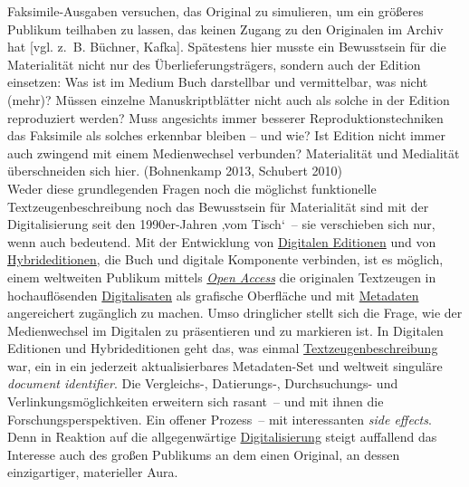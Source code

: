 \documentclass{article}
\begin{document}
        Faksimile-Ausgaben versuchen, das Original zu simulieren, um ein größeres Publikum
                  teilhaben zu lassen, das keinen Zugang zu den Originalen im Archiv hat [vgl. z. B.
                  Büchner, Kafka]. Spätestens hier musste ein Bewusstsein für die Materialität nicht
                  nur des Überlieferungsträgers, sondern auch der Edition einsetzen: Was ist im
                  Medium Buch darstellbar und vermittelbar, was nicht (mehr)? Müssen einzelne
                  Manuskriptblätter nicht auch als solche in der Edition reproduziert werden? Muss
                  angesichts immer besserer Reproduktionstechniken das Faksimile als solches
                  erkennbar bleiben – und wie? Ist Edition nicht immer auch zwingend mit einem
                  Medienwechsel verbunden? Materialität und Medialität überschneiden sich hier.
                     (Bohnenkamp 2013, Schubert 2010)\\
            
        Weder diese grundlegenden Fragen noch die möglichst funktionelle
                  Textzeugenbeschreibung noch das Bewusstsein für Materialität sind mit der
                  Digitalisierung seit den 1990er-Jahren ‚vom Tisch‘ – sie verschieben sich nur,
                  wenn auch bedeutend. Mit der Entwicklung von \href{http://gams.uni-graz.at/o:konde.59}{Digitalen Editionen} und von \href{http://gams.uni-graz.at/o:konde.96}{Hybrideditionen}, die Buch und digitale Komponente
                  verbinden, ist es möglich, einem weltweiten Publikum mittels \emph{\href{http://gams.uni-graz.at/o:konde.152}{Open Access}} die originalen Textzeugen in hochauflösenden \href{http://gams.uni-graz.at/o:konde.36}{Digitalisaten} als grafische Oberfläche und mit \href{http://gams.uni-graz.at/o:konde.25}{Metadaten} angereichert zugänglich zu
                  machen. Umso dringlicher stellt sich die Frage, wie der Medienwechsel im Digitalen
                  zu präsentieren und zu markieren ist. In Digitalen Editionen und Hybrideditionen
                  geht das, was einmal \href{http://gams.uni-graz.at/o:konde.92}{Textzeugenbeschreibung} war, ein in ein jederzeit aktualisierbares
                  Metadaten-Set und weltweit singuläre \emph{document identifier}.
                  Die Vergleichs-, Datierungs-, Durchsuchungs- und Verlinkungsmöglichkeiten
                  erweitern sich rasant – und mit ihnen die Forschungsperspektiven. Ein offener
                  Prozess – mit interessanten \emph{side effects}. Denn in Reaktion
                  auf die allgegenwärtige \href{http://gams.uni-graz.at/o:konde.60}{Digitalisierung} steigt auffallend das Interesse auch des großen
                  Publikums an dem einen Original, an dessen einzigartiger, materieller Aura.\\
            
\end{document}
